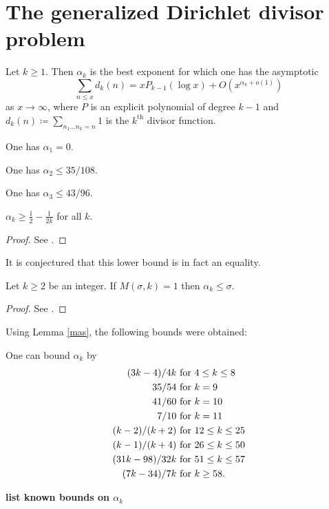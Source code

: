 \chapter{The generalized Dirichlet divisor problem}

\begin{definition}\label{divisor-def} Let $k \geq 1$. Then $\alpha_k$ is the best exponent for which one has the asymptotic
$$ \sum_{n \leq x} d_k(n) = x P_{k-1}(\log x) + O(x^{\alpha_k+o(1)})$$
as $x \to \infty$, where $P$ is an explicit polynomial of degree $k-1$ and $d_k(n) \coloneqq \sum_{n_1 \dots n_k=n} 1$ is the $k^{\mathrm{th}}$ divisor function.
\end{definition}

\begin{lemma}[$d_1$ exponent] One has $\alpha_1=0$.
\end{lemma}

\begin{lemma}\cite[Theorem 13.1]{ivic} One has $\alpha_2 \leq 35/108$.
\end{lemma}

\begin{lemma}\cite{kolesnik} One has $\alpha_3 \leq 43/96$.
\end{lemma}


\begin{lemma} $\alpha_k \geq \frac{1}{2} - \frac{1}{2k}$ for all $k$.
\end{lemma}

\begin{proof} See \cite{hardy_divisor_1916, szego-walfisz-I, szego-walfisz-II}.
\end{proof}

It is conjectured that this lower bound is in fact an equality.

\begin{lemma}\label{mas}  Let $k \geq 2$ be an integer. If $M(\sigma,k) = 1$ then $\alpha_k \leq \sigma$.
\end{lemma}

\begin{proof}  See \cite[\S 13.3]{ivic}.
\end{proof}

Using Lemma \ref{mas}, the following bounds were obtained:

\begin{theorem}\cite[Theorem 13.12]{ivic}  One can bound $\alpha_k$ by
    \begin{align*}
        (3k-4)/4k & \hbox{ for } 4 \leq k \leq 8 \\
        35/54 & \hbox{ for } k = 9 \\
        41/60 & \hbox{ for } k = 10 \\
        7/10 & \hbox{ for } k = 11 \\
        (k-2)/(k+2) & \hbox{ for } 12 \leq k \leq 25 \\
        (k-1)/(k+4) & \hbox{ for } 26 \leq k \leq 50 \\
        (31k-98)/32k & \hbox{ for } 51 \leq k \leq 57 \\
        (7k-34)/7k & \hbox{ for } k \geq 58.
    \end{align*}
\end{theorem}


{\bf list known bounds on $\alpha_k$}